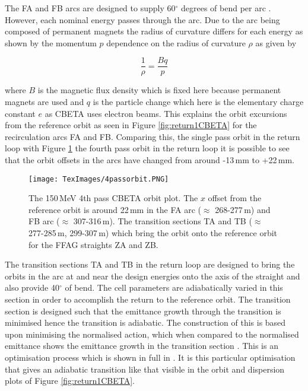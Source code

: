 \documentclass[11pt]{article}
\begin{document}
The FA and FB arcs are designed to supply 60$^{\circ}$ degrees of bend per arc \cite{CBETATDR}. However, each nominal energy passes through the arc. Due to the arc being composed of permanent magnets the radius of curvature differs for each energy as shown by the momentum $p$ dependence on the radius of curvature $\rho$ as given by

\begin{equation}
\frac{1}{\rho} = \frac{Bq}{p}
\label{eq:beamrig}
\end{equation}

\noindent where $B$ is the magnetic flux density which is fixed here because permanent magnets are used and $q$ is the particle change which here is the elementary charge constant $e$ as CBETA uses electron beams. This explains the orbit excursions from the reference orbit as seen in Figure \ref{fig:return1CBETA} for the recirculation arcs FA and FB. Comparing this, the single pass orbit in the return loop with Figure \ref{fig:4passorbit} the fourth pass orbit in the return loop it is possible to see that the orbit offsets in the arcs have changed from around -13\,mm to +22\,mm.

\begin{figure}[H]
\centering
\texttt{[image: TexImages/4passorbit.PNG]}
\caption{\label{fig:4passorbit} The 150\,MeV 4th pass CBETA orbit plot. The $x$ offset from the reference orbit is around 22\,mm in the FA arc ($\approx$ 268-277\,m) and FB arc ($\approx$ 307-316\,m). The transition sections TA and TB ($\approx$ 277-285\,m, 299-307\,m) which bring the orbit onto the reference orbit for the FFAG straights ZA and ZB.}
\end{figure}

The transition sections TA and TB in the return loop are designed to bring the orbits in the arc at and near the design energies
onto the axis of the straight \cite{CBETATDR} and also provide 40$^{\circ}$ of bend. The cell parameters are adiabatically varied in this section in order to accomplish the return to the reference orbit.  The transition section is designed such that the emittance growth through the transition is minimised hence the transition is adiabatic. The construction of this is based upon minimising the normalised action, which when compared to the normalised emittance shows the emittance growth in the transition section \cite{CBETATDR}. This is an optimisation process which is shown in full in \cite{CBETATDR}. It is this particular optimisation that gives an adiabatic transition like that visible in the orbit and dispersion plots of Figure \ref{fig:return1CBETA}. 
\end{document}
